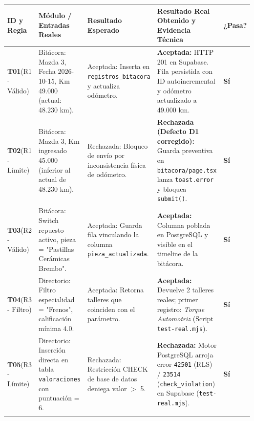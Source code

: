 \documentclass[11pt,letterpaper]{article}
\begin{document}
\begin{table}[h!]
\centering
\small
\begin{tabularx}{\textwidth}{p{1.8cm}p{3.8cm}p{3.5cm}X>{\centering\arraybackslash}p{1.2cm}}
\toprule
\textbf{ID y Regla} & \textbf{Módulo / Entradas Reales} & \textbf{Resultado Esperado} & \textbf{Resultado Real Obtenido y Evidencia Técnica} & \textbf{¿Pasa?} \\
\midrule
\textbf{T01}\newline(R1 - Válido) & Bitácora: Mazda 3, Fecha 2026-10-15, Km 49.000 (actual: 48.230 km). & Aceptada: Inserta en \texttt{registros\_bitacora} y actualiza odómetro. & \textbf{Aceptada:} HTTP 201 en Supabase. Fila persistida con ID autoincremental y odómetro actualizado a 49.000 km. & \textbf{\color{succgreen}Sí} \\
\addlinespace
\textbf{T02}\newline(R1 - Límite) & Bitácora: Mazda 3, Km ingresado 45.000 (inferior al actual de 48.230 km). & Rechazada: Bloqueo de envío por inconsistencia física de odómetro. & \textbf{Rechazada (Defecto D1 corregido):} Guarda preventiva en \texttt{bitacora/page.tsx} lanza \texttt{toast.error} y bloquea \texttt{submit()}. & \textbf{\color{succgreen}Sí} \\
\addlinespace
\textbf{T03}\newline(R2 - Válido) & Bitácora: Switch repuesto activo, pieza = "Pastillas Cerámicas Brembo". & Aceptada: Guarda fila vinculando la columna \texttt{pieza\_actualizada}. & \textbf{Aceptada:} Columna poblada en PostgreSQL y visible en el timeline de la bitácora. & \textbf{\color{succgreen}Sí} \\
\addlinespace
\textbf{T04}\newline(R3 - Filtro) & Directorio: Filtro especialidad = "Frenos", calificación mínima 4.0. & Aceptada: Retorna talleres que coinciden con el parámetro. & \textbf{Aceptada:} Devuelve 2 talleres reales; primer registro: \textit{Torque Automotriz} (Script \texttt{test-real.mjs}). & \textbf{\color{succgreen}Sí} \\
\addlinespace
\textbf{T05}\newline(R3 - Límite) & Directorio: Inserción directa en tabla \texttt{valoraciones} con puntuación = 6. & Rechazada: Restricción CHECK de base de datos deniega valor $>$ 5. & \textbf{Rechazada:} Motor PostgreSQL arroja error \texttt{42501} (RLS) / \texttt{23514} (\texttt{check\_violation}) en Supabase (\texttt{test-real.mjs}). & \textbf{\color{succgreen}Sí} \\
\addlinespace

\end{tabularx}
\end{table}
\end{document}
